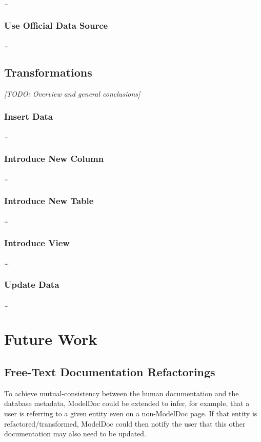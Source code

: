 \documentclass{acm_proc_article-sp}
\begin{document}
\ldots

\subsubsection{Use Official Data Source}

\ldots


\subsection{Transformations}

\textit{[TODO: Overview and general conclusions]}

\subsubsection{Insert Data}

\ldots

\subsubsection{Introduce New Column}

\ldots

\subsubsection{Introduce New Table}

\ldots

\subsubsection{Introduce View}

\ldots

\subsubsection{Update Data}

\ldots

\section{Future Work}

\subsection{Free-Text Documentation Refactorings}

To achieve mutual-consistency between the human documentation and the database
metadata, ModelDoc could be extended to infer, for example, that a user is
referring to a given entity even on a non-ModelDoc page.  If that entity
is refactored/transformed, ModelDoc could then notify the user that this other
documentation may also need to be updated.
\end{document}

